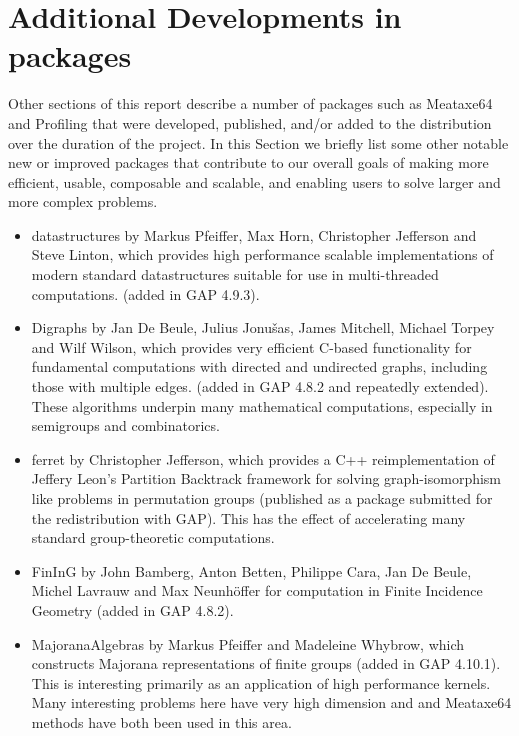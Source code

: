 \section{Additional Developments in \GAP packages} \label{sec:packages}

Other sections of this report describe
a number of \GAP packages such as Meataxe64 and Profiling that were developed, published,
and/or added to the \GAP distribution over the duration of the project.  In this Section
we briefly list some other notable new or improved packages that
contribute to our overall goals of making \GAP more efficient, usable,
composable and scalable, and enabling users to solve larger and more
complex problems.

\begin{itemize}

\item
{\sf datastructures} \cite{datastructures} by Markus Pfeiffer, Max Horn, 
Christopher Jefferson and Steve Linton, which provides high
performance scalable implementations of modern standard datastructures
suitable for use in multi-threaded computations. (added in GAP 4.9.3).

\item
{\sf Digraphs} by Jan De Beule, Julius Jonu\v{s}as, James Mitchell,
Michael Torpey and Wilf Wilson, which provides very efficient C-based
functionality for fundamental computations
with directed and undirected graphs, including those with multiple edges. (added in GAP 4.8.2 and
repeatedly extended).  These algorithms underpin many mathematical
computations, especially in semigroups and combinatorics.

\item
{\sf ferret}  by Christopher Jefferson, which provides a C++
reimplementation of Jeffery Leon's Partition Backtrack framework for
solving graph-isomorphism like problems in permutation groups
(published as a package submitted for the redistribution with
GAP). This has the effect of accelerating many standard
group-theoretic computations.

\item
{\sf FinInG}  by John Bamberg, Anton Betten, Philippe Cara, Jan De Beule, Michel Lavrauw and Max Neunh\"offer for computation in Finite Incidence Geometry (added in GAP 4.8.2).

\item
{\sf MajoranaAlgebras} by Markus Pfeiffer and Madeleine Whybrow, 
which constructs Majorana representations of finite groups (added in
GAP 4.10.1). This is interesting primarily as an application of high
performance kernels. Many interesting problems here have very high
dimension and \HPCGAP and Meataxe64 methods have both been used in
this area.


\end{itemize}
